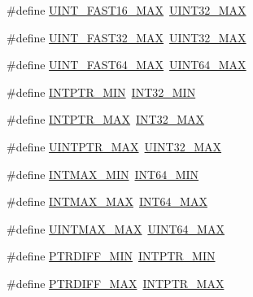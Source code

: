 \begin{DoxyCompactItemize}
\item 
\#define \hyperlink{stdint_8h_aed28ca63d9b222f6f1377358fe73a183}{U\-I\-N\-T\-\_\-\-F\-A\-S\-T16\-\_\-\-M\-A\-X}~\hyperlink{stdint_8h_ab5eb23180f7cc12b7d6c04a8ec067fdd}{U\-I\-N\-T32\-\_\-\-M\-A\-X}
\item 
\#define \hyperlink{stdint_8h_ad51246a178143208b2db3315efd21c45}{U\-I\-N\-T\-\_\-\-F\-A\-S\-T32\-\_\-\-M\-A\-X}~\hyperlink{stdint_8h_ab5eb23180f7cc12b7d6c04a8ec067fdd}{U\-I\-N\-T32\-\_\-\-M\-A\-X}
\item 
\#define \hyperlink{stdint_8h_aeb74410af7781bc84b5f64ae7a8f4a17}{U\-I\-N\-T\-\_\-\-F\-A\-S\-T64\-\_\-\-M\-A\-X}~\hyperlink{stdint_8h_a30654b4b67d97c42ca3f9b6052dda916}{U\-I\-N\-T64\-\_\-\-M\-A\-X}
\item 
\#define \hyperlink{stdint_8h_a2aaa6d3aa1d7d1e0e326955aa24db752}{I\-N\-T\-P\-T\-R\-\_\-\-M\-I\-N}~\hyperlink{stdint_8h_a688eb21a22db27c2b2bd5836943cdcbe}{I\-N\-T32\-\_\-\-M\-I\-N}
\item 
\#define \hyperlink{stdint_8h_a9e5742f2bae4a5283431a3c03499e3a9}{I\-N\-T\-P\-T\-R\-\_\-\-M\-A\-X}~\hyperlink{stdint_8h_a181807730d4a375f848ba139813ce04f}{I\-N\-T32\-\_\-\-M\-A\-X}
\item 
\#define \hyperlink{stdint_8h_ab2355300ea19395357e62d780f4dd073}{U\-I\-N\-T\-P\-T\-R\-\_\-\-M\-A\-X}~\hyperlink{stdint_8h_ab5eb23180f7cc12b7d6c04a8ec067fdd}{U\-I\-N\-T32\-\_\-\-M\-A\-X}
\item 
\#define \hyperlink{stdint_8h_a2b0a3edfc672154f606dc3ad26277b61}{I\-N\-T\-M\-A\-X\-\_\-\-M\-I\-N}~\hyperlink{stdint_8h_ab21f12f372f67b8ff0aa3432336ede67}{I\-N\-T64\-\_\-\-M\-I\-N}
\item 
\#define \hyperlink{stdint_8h_a022b9b0a3564d786244a4631847c37a3}{I\-N\-T\-M\-A\-X\-\_\-\-M\-A\-X}~\hyperlink{stdint_8h_ad0d744f05898e32d01f73f8af3cd2071}{I\-N\-T64\-\_\-\-M\-A\-X}
\item 
\#define \hyperlink{stdint_8h_aa54fd5210434219e9027bfa0f0e325c8}{U\-I\-N\-T\-M\-A\-X\-\_\-\-M\-A\-X}~\hyperlink{stdint_8h_a30654b4b67d97c42ca3f9b6052dda916}{U\-I\-N\-T64\-\_\-\-M\-A\-X}
\item 
\#define \hyperlink{stdint_8h_ad9b88ba2fb858f98b50b38e49875d90e}{P\-T\-R\-D\-I\-F\-F\-\_\-\-M\-I\-N}~\hyperlink{stdint_8h_a2aaa6d3aa1d7d1e0e326955aa24db752}{I\-N\-T\-P\-T\-R\-\_\-\-M\-I\-N}
\item 
\#define \hyperlink{stdint_8h_add2ef7bffac19cfdd1f4b5495409672f}{P\-T\-R\-D\-I\-F\-F\-\_\-\-M\-A\-X}~\hyperlink{stdint_8h_a9e5742f2bae4a5283431a3c03499e3a9}{I\-N\-T\-P\-T\-R\-\_\-\-M\-A\-X}
\item 

\end{DoxyCompactItemize}
